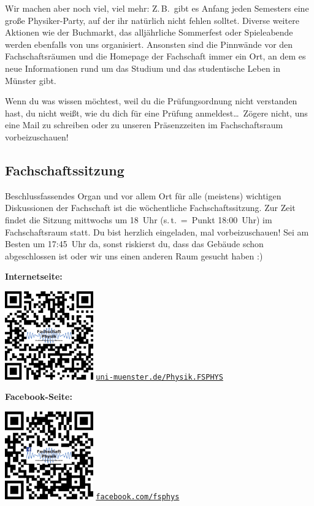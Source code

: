 \begin{multicols}{2}
Wir machen aber noch viel, viel mehr: Z.\,B.\ gibt es Anfang jeden Semesters eine große Physiker-Party, auf der ihr natürlich nicht fehlen solltet.
Diverse weitere Aktionen wie der Buchmarkt, das alljährliche Sommerfest oder Spieleabende werden ebenfalls von uns organisiert.
Ansonsten sind die Pinnwände vor den Fachschaftsräumen und die Homepage der Fachschaft immer ein Ort, an dem es neue Informationen rund um das Studium und das studentische Leben in Münster gibt.

Wenn du was wissen möchtest, weil du die Prüfungsordnung nicht verstanden hast, du nicht weißt, wie du dich für eine Prüfung anmeldest\dots\
Zögere nicht, uns eine Mail zu schreiben oder zu unseren Präsenzzeiten im Fachschaftsraum vorbeizuschauen!

\subsection*{Fachschaftssitzung}
Beschlussfassendes Organ und vor allem Ort für alle (meistens) wichtigen Diskussionen  der Fachschaft ist die wöchentliche Fachschaftssitzung.
Zur Zeit findet die Sitzung mittwochs um 18~Uhr (s.\,t.~=~Punkt 18:00~Uhr) im Fachschaftsraum statt.
Du bist herzlich eingeladen, mal vorbeizuschauen! Sei am Besten um 17:45~Uhr da, sonst riskierst du, dass das Gebäude schon abgeschlossen ist oder wir uns einen anderen Raum gesucht haben :)

\begin{minipage}{\columnwidth}
	\begin{minipage}[t]{5cm}
		\raggedright\parskip=0.1cm
		\textbf{Internetseite:}
	
		\includegraphics[width=3.8cm]{res/fsphys_qrcode_homepage.png}
		\scriptsize
		\href{https://www.uni-muenster.de/Physik.FSPHYS/}{\texttt{uni-muenster.de/Physik.FSPHYS}}
	\end{minipage}
	\hfill
	\begin{minipage}[t]{4cm}
		\raggedleft\parskip=0.1cm
		\textbf{Facebook-Seite:}
	
		\includegraphics[width=3.8cm]{res/fsphys_qrcode_facebook.png}
		\scriptsize
		\href{https://facebook.com/fsphys}{\texttt{facebook.com/fsphys}}
	\end{minipage}
\end{minipage}
\end{multicols}
